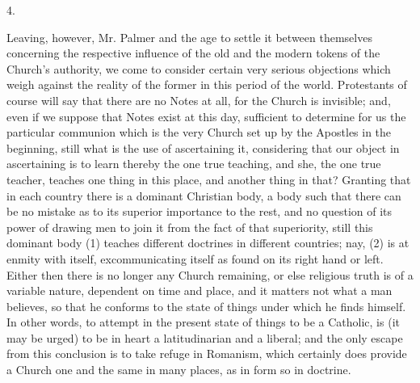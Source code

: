 4.

Leaving, however, Mr. Palmer and the age to
settle it between themselves concerning the respective influence of
the old and the modern tokens of the Church's authority, we come to
consider certain very serious objections which weigh against the
reality of the former in this period of the world. Protestants of
course will say that there are no Notes at all, for the Church is
invisible; and, even if we suppose that Notes exist at this day,
sufficient to determine for us the particular communion which is the
very Church set up by the Apostles in the beginning, still what is the
use of ascertaining it, considering that our object in ascertaining is
to learn thereby the one true teaching, and she, the one true teacher,
teaches one thing in this place, and another thing in that? Granting
that in each country there is a dominant Christian body, a body such that there can be no mistake as to its superior importance to the
rest, and no question of its power of drawing men to join it from the
fact of that superiority, still this dominant body (1) teaches
different doctrines in different countries; nay, (2) is at enmity with
itself, excommunicating itself as found on its right hand or left.
Either then there is no longer any Church remaining, or else religious
truth is of a variable nature, dependent on time and place, and it
matters not what a man believes, so that he conforms to the state of
things under which he finds himself. In other words, to attempt in the
present state of things to be a Catholic, is (it may be urged) to be
in heart a latitudinarian and a liberal; and the only escape from this
conclusion is to take refuge in Romanism, which certainly does provide
a Church one and the same in many places, as in form so in doctrine.

